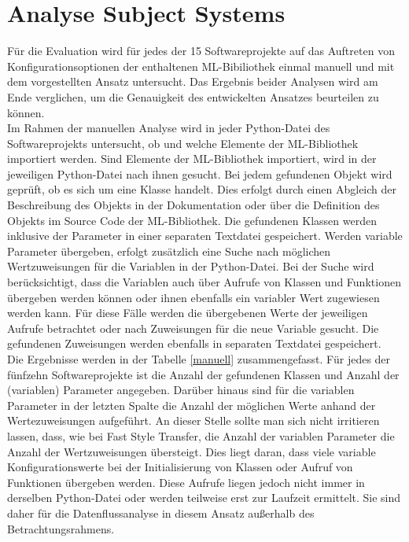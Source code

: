 \documentclass[german,bachelor]{swsLeipzig}
\begin{document}
\section{Analyse Subject Systems}
Für die Evaluation wird für jedes der 15 Softwareprojekte auf das Auftreten von Konfigurationsoptionen der enthaltenen ML-Bibiliothek
einmal manuell und mit dem vorgestellten Ansatz untersucht.
Das Ergebnis beider Analysen wird am Ende verglichen, um die Genauigkeit des entwickelten Ansatzes beurteilen zu können.\\
\indent Im Rahmen der manuellen Analyse wird in jeder Python-Datei des Softwareprojekts untersucht, ob und welche Elemente der ML-Bibliothek
importiert werden.
Sind Elemente der ML-Bibliothek importiert, wird in der jeweiligen Python-Datei nach ihnen gesucht.
Bei jedem gefundenen Objekt wird geprüft, ob es sich um eine Klasse handelt.
Dies erfolgt durch einen Abgleich der Beschreibung des Objekts in der Dokumentation oder
über die Definition des Objekts im Source Code der ML-Bibliothek.
Die gefundenen Klassen werden inklusive der Parameter in einer separaten Textdatei gespeichert.
Werden variable Parameter übergeben, erfolgt zusätzlich eine Suche nach möglichen Wertzuweisungen für die Variablen in der Python-Datei.
Bei der Suche wird berücksichtigt, dass die Variablen auch über Aufrufe von Klassen und Funktionen übergeben werden können oder ihnen ebenfalls ein
variabler Wert zugewiesen werden kann.
Für diese Fälle werden die übergebenen Werte der jeweiligen Aufrufe betrachtet oder nach Zuweisungen für die neue Variable gesucht.
Die gefundenen Zuweisungen werden ebenfalls in separaten Textdatei gespeichert.\\
\indent Die Ergebnisse werden in der Tabelle \ref{manuell} zusammengefasst.
Für jedes der fünfzehn Softwareprojekte ist die Anzahl der gefundenen Klassen und Anzahl der
(variablen) Parameter angegeben.
Darüber hinaus sind für die variablen Parameter in der letzten Spalte die Anzahl der möglichen Werte anhand
der Wertezuweisungen aufgeführt.
An dieser Stelle sollte man sich nicht irritieren lassen, dass, wie bei Fast Style Transfer, die Anzahl der variablen Parameter
die Anzahl der Wertzuweisungen übersteigt.
Dies liegt daran, dass viele variable Konfigurationswerte bei der Initialisierung von Klassen oder Aufruf von Funktionen
übergeben werden.
Diese Aufrufe liegen jedoch nicht immer in derselben Python-Datei oder werden teilweise erst zur Laufzeit ermittelt.
Sie sind daher für die Datenflussanalyse in diesem Ansatz außerhalb des Betrachtungsrahmens.
\end{document}
